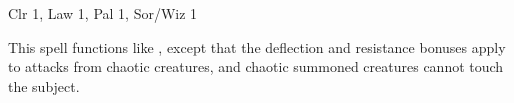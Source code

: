 
\begin{description*}
\item[Level:] Clr 1, Law 1, Pal 1, Sor/Wiz 1
\end{description*}

This spell functions like , except that the deflection
and resistance bonuses apply to attacks from chaotic creatures, and chaotic summoned
creatures cannot touch the subject.